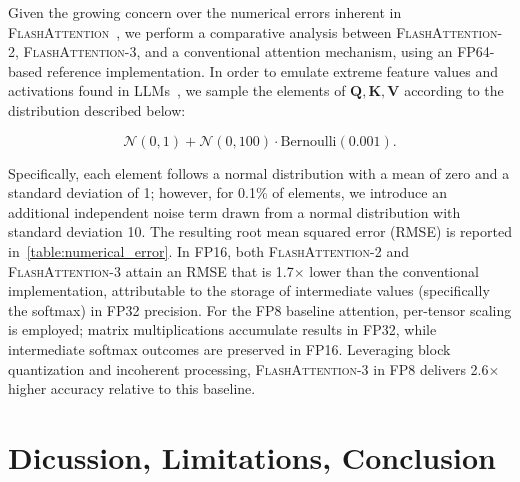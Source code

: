 \begin{enumerate}
Given the growing concern over the numerical errors inherent in \textsc{FlashAttention}~\citep{golden2024flash}, we perform a comparative analysis between \textsc{FlashAttention-2}, \textsc{FlashAttention-3}, and a conventional attention mechanism, using an FP64-based reference implementation. In order to emulate extreme feature values and activations found in LLMs~\citep{dettmers2208llm, sun2024massive}, we sample the elements of $\mathbf{Q}, \mathbf{K}, \mathbf{V}$ according to the distribution described below:

\begin{equation*}
  \mathcal{N}(0, 1) + \mathcal{N}(0, 100) \cdot \mathrm{Bernoulli}(0.001).
\end{equation*}

Specifically, each element follows a normal distribution with a mean of zero and a standard deviation of 1; however, for 0.1\% of elements, we introduce an additional independent noise term drawn from a normal distribution with standard deviation 10. The resulting root mean squared error (RMSE) is reported in~\cref{table:numerical_error}. In FP16, both \textsc{FlashAttention-2} and \textsc{FlashAttention-3} attain an RMSE that is 1.7$\times$ lower than the conventional implementation, attributable to the storage of intermediate values (specifically the softmax) in FP32 precision. For the FP8 baseline attention, per-tensor scaling is employed; matrix multiplications accumulate results in FP32, while intermediate softmax outcomes are preserved in FP16. Leveraging block quantization and incoherent processing, \textsc{FlashAttention-3} in FP8 delivers 2.6$\times$ higher accuracy relative to this baseline.

\section{Dicussion, Limitations, Conclusion}
\label{sec:discussion}


\end{enumerate}
